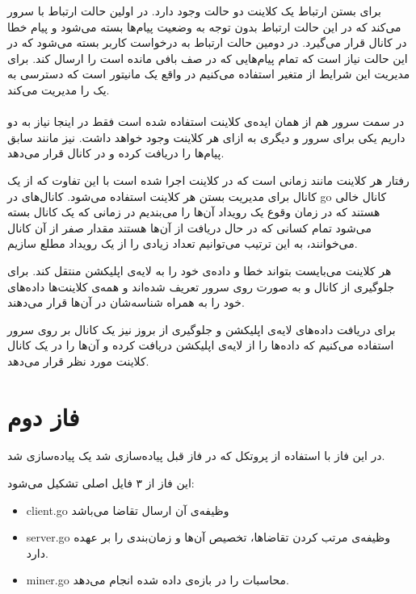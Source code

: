 \documentclass[paper=a4, fontsize=11pt]{article}
\numberwithin{equation}{section} %
\numberwithin{figure}{section} %
\numberwithin{table}{section} %
\begin{document}
برای بستن ارتباط یک کلاینت دو حالت وجود دارد. در اولین حالت
ارتباط با سرور  می‌کند که در این حالت
ارتباط بدون توجه به وضعیت پیام‌ها بسته می‌شود و پیام خطا در
کانال  قرار می‌گیرد.
در دومین حالت ارتباط به درخواست کاربر بسته می‌شود که در این حالت
نیاز است که 
تمام پیام‌هایی که در صف بافی مانده است را ارسال کند.
برای مدیریت این شرایط از متغیر  استفاده می‌کنیم
در واقع یک مانیتور است که دسترسی به یک 
را مدیریت می‌کند.

\paragraph{}
در سمت سرور هم از همان ایده‌ی کلاینت استفاده شده است فقط در اینجا
نیاز به دو 
داریم یکی برای سرور و دیگری به ازای هر کلاینت وجود خواهد داشت.
 نیز مانند سابق پیام‌ها را دریافت کرده
و در کانال  قرار می‌دهد.

رفتار  هر کلاینت مانند زمانی است که در کلاینت اجرا شده است
با این تفاوت که از یک کانال  برای مدیریت بستن هر کلاینت استفاده می‌شود.
کانال‌های  در go کانال خالی هستند که در زمان وقوع یک رویداد آن‌ها را می‌بندیم
در زمانی که یک کانال بسته می‌شود تمام کسانی که در حال دریافت از آن‌ها هستند مقدار صفر از آن کانال می‌خوانند،
به این ترتیب می‌توانیم تعداد زیادی  را از یک رویداد مطلع سازیم.

هر کلاینت می‌بایست بتواند خطا و داده‌ی خود را به لایه‌ی اپلیکشن منتقل کند. برای جلوگیری از
کانال  و 
به صورت 
روی سرور تعریف شده‌اند و همه‌ی کلاینت‌ها داده‌های خود را به همراه شناسه‌شان در آن‌ها قرار می‌دهند.

برای دریافت داده‌های لایه‌ی اپلیکشن و جلوگیری از بروز
نیز یک کانال  بر روی سرور استفاده می‌کنیم
که داده‌ها را از لایه‌ی اپلیکشن دریافت کرده و آن‌ها را در یک کانال
کلاینت مورد نظر قرار می‌دهد.

\section{فاز دوم}
\paragraph{}
در این فاز با استفاده از پروتکل 
که در فاز قبل پیاده‌سازی شد یک 
پیاده‌سازی شد.

این فاز از ۳ فایل اصلی تشکیل می‌شود:
\begin{itemize}
    \item client.go
    وظیفه‌ی آن ارسال تقاضا می‌باشد
    \item server.go
    وظیفه‌ی مرتب کردن تقاضاها، تخصیص آن‌ها و زمان‌بندی را بر عهده دارد.
    \item miner.go
    محاسبات  را در بازه‌ی داده شده انجام می‌دهد.
\end{itemize}
\end{document}
